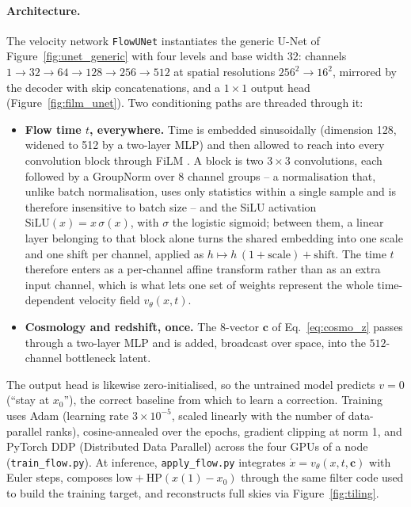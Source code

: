\documentclass{report}
\begin{document}
\paragraph{Architecture.} The velocity network \texttt{FlowUNet} instantiates the generic U-Net of Figure~\ref{fig:unet_generic} with four levels and base width 32: channels $1\to32\to64\to128\to256\to512$ at spatial resolutions $256^2 \to 16^2$, mirrored by the decoder with skip concatenations, and a $1\times1$ output head (Figure~\ref{fig:film_unet}). Two conditioning paths are threaded through it:
\begin{itemize}
  \item \textbf{Flow time $t$, everywhere.} Time is embedded sinusoidally (dimension 128, widened to 512 by a two-layer MLP) and then allowed to reach into every convolution block through FiLM \cite{perez_film_2017}. A block is two \mbox{$3\times3$} convolutions, each followed by a GroupNorm over 8 channel groups -- a normalisation that, unlike batch normalisation, uses only statistics within a single sample and is therefore insensitive to batch size -- and the SiLU activation \mbox{$\mathrm{SiLU}(x) = x\,\sigma(x)$}, with \mbox{$\sigma$} the logistic sigmoid; between them, a linear layer belonging to that block alone turns the shared embedding into one scale and one shift per channel, applied as \mbox{$h \mapsto h\,(1+\mathrm{scale}) + \mathrm{shift}$}. The time \mbox{$t$} therefore enters as a per-channel affine transform rather than as an extra input channel, which is what lets one set of weights represent the whole time-dependent velocity field \mbox{$v_\theta(x, t)$}.
  \item \textbf{Cosmology and redshift, once.} The 8-vector $\mathbf{c}$ of Eq.~\eqref{eq:cosmo_z} passes through a two-layer MLP and is added, broadcast over space, into the $512$-channel bottleneck latent.
\end{itemize}
The output head is likewise zero-initialised, so the untrained model predicts $v = 0$ (``stay at $x_0$''), the correct baseline from which to learn a correction. Training uses Adam (learning rate $3\times10^{-5}$, scaled linearly with the number of data-parallel ranks), cosine-annealed over the epochs, gradient clipping at norm 1, and PyTorch DDP (Distributed Data Parallel) across the four GPUs of a node (\texttt{train\_flow.py}). At inference, \texttt{apply\_flow.py} integrates $\dot x = v_\theta(x, t, \mathbf{c})$ with Euler steps, composes $\mathrm{low} + \mathrm{HP}(x(1) - x_0)$ through the same filter code used to build the training target, and reconstructs full skies via Figure~\ref{fig:tiling}.
\end{document}
